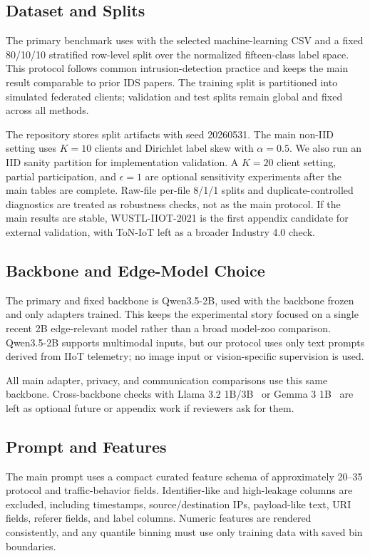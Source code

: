 \subsection{Dataset and Splits}
The primary benchmark uses \dataset with the selected machine-learning CSV and a fixed 80/10/10 stratified row-level split over the normalized fifteen-class label space. This protocol follows common \dataset intrusion-detection practice and keeps the main result comparable to prior IDS papers. The training split is partitioned into simulated federated clients; validation and test splits remain global and fixed across all methods.

The repository stores split artifacts with seed 20260531. The main non-IID setting uses $K=10$ clients and Dirichlet label skew with $\alpha=0.5$. We also run an IID sanity partition for implementation validation. A $K=20$ client setting, partial participation, and $\epsilon=1$ are optional sensitivity experiments after the main tables are complete. Raw-file per-file 8/1/1 splits and duplicate-controlled diagnostics are treated as robustness checks, not as the main protocol. If the main \dataset results are stable, WUSTL-IIOT-2021 is the first appendix candidate for external validation, with ToN-IoT left as a broader Industry 4.0 check.

\subsection{Backbone and Edge-Model Choice}
The primary and fixed backbone is Qwen3.5-2B, used with the backbone frozen and only adapters trained. This keeps the experimental story focused on a single recent 2B edge-relevant model rather than a broad model-zoo comparison. Qwen3.5-2B supports multimodal inputs, but our protocol uses only text prompts derived from IIoT telemetry; no image input or vision-specific supervision is used.

All main adapter, privacy, and communication comparisons use this same backbone. Cross-backbone checks with Llama 3.2 1B/3B~\citep{meta2024llama32} or Gemma 3 1B~\citep{gemma3technicalreport} are left as optional future or appendix work if reviewers ask for them.

\subsection{Prompt and Features}
The main prompt uses a compact curated feature schema of approximately 20--35 protocol and traffic-behavior fields. Identifier-like and high-leakage columns are excluded, including timestamps, source/destination IPs, payload-like text, URI fields, referer fields, and label columns. Numeric features are rendered consistently, and any quantile binning must use only training data with saved bin boundaries.

